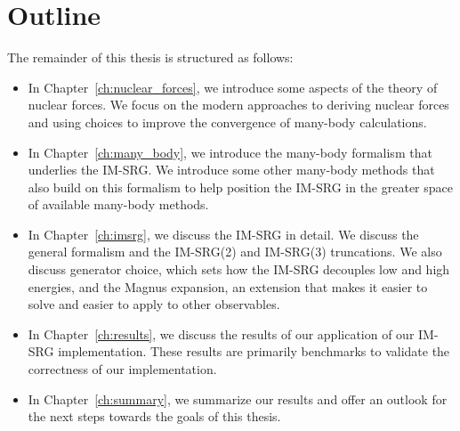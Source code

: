 \section{Outline}

The remainder of this thesis is structured as follows:
\begin{itemize}
  \item{In Chapter~\ref{ch:nuclear_forces},
    we introduce some aspects of the theory of nuclear forces.
    We focus on the modern approaches to deriving nuclear forces
    and using choices to improve the convergence of many-body calculations.}
  \item{In Chapter~\ref{ch:many_body},
    we introduce the many-body formalism that underlies the IM-SRG.\@
    We introduce some other many-body methods that also build on this formalism
    to help position the IM-SRG in the greater space of available many-body methods.}
  \item{In Chapter~\ref{ch:imsrg},
    we discuss the IM-SRG in detail.
    We discuss the general formalism and the IM-SRG(2) and IM-SRG(3) truncations.
    We also discuss generator choice,
    which sets how the IM-SRG decouples low and high energies,
    and the Magnus expansion,
    an extension that makes it easier to solve and easier to apply to other observables.}
  \item{In Chapter~\ref{ch:results},
    we discuss the results of our application of our IM-SRG implementation.
    These results are primarily benchmarks to validate the correctness of our implementation.}
  \item{In Chapter~\ref{ch:summary},
    we summarize our results
    and offer an outlook for the next steps towards the goals of this thesis.}
\end{itemize}

